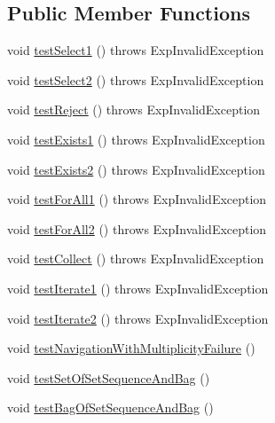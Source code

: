 \subsection*{Public Member Functions}
\begin{DoxyCompactItemize}
\item 
void \hyperlink{classorg_1_1tzi_1_1use_1_1uml_1_1ocl_1_1expr_1_1_exp_query_test_a48f9c32de266f47f7a2e7deccea89e3f}{test\-Select1} ()  throws Exp\-Invalid\-Exception 
\item 
void \hyperlink{classorg_1_1tzi_1_1use_1_1uml_1_1ocl_1_1expr_1_1_exp_query_test_a44a19bb900652731938106e8db5e33ff}{test\-Select2} ()  throws Exp\-Invalid\-Exception 
\item 
void \hyperlink{classorg_1_1tzi_1_1use_1_1uml_1_1ocl_1_1expr_1_1_exp_query_test_a524c7f648f0b6d2ce600016763020699}{test\-Reject} ()  throws Exp\-Invalid\-Exception 
\item 
void \hyperlink{classorg_1_1tzi_1_1use_1_1uml_1_1ocl_1_1expr_1_1_exp_query_test_a9680e0825b4ad2004eacb80a361f6c93}{test\-Exists1} ()  throws Exp\-Invalid\-Exception 
\item 
void \hyperlink{classorg_1_1tzi_1_1use_1_1uml_1_1ocl_1_1expr_1_1_exp_query_test_a1529ea71363b55a8ad2ff38074d3a0f1}{test\-Exists2} ()  throws Exp\-Invalid\-Exception 
\item 
void \hyperlink{classorg_1_1tzi_1_1use_1_1uml_1_1ocl_1_1expr_1_1_exp_query_test_a9b1b40019e4f3f73c9524ae219293b9a}{test\-For\-All1} ()  throws Exp\-Invalid\-Exception 
\item 
void \hyperlink{classorg_1_1tzi_1_1use_1_1uml_1_1ocl_1_1expr_1_1_exp_query_test_ac8f35717bdc4b2c28c3fe66409ba7d96}{test\-For\-All2} ()  throws Exp\-Invalid\-Exception 
\item 
void \hyperlink{classorg_1_1tzi_1_1use_1_1uml_1_1ocl_1_1expr_1_1_exp_query_test_a46e50ffd2ebe64d2f19d60272c5c2320}{test\-Collect} ()  throws Exp\-Invalid\-Exception 
\item 
void \hyperlink{classorg_1_1tzi_1_1use_1_1uml_1_1ocl_1_1expr_1_1_exp_query_test_abea1607bf570adfc31d3c3299071f634}{test\-Iterate1} ()  throws Exp\-Invalid\-Exception 
\item 
void \hyperlink{classorg_1_1tzi_1_1use_1_1uml_1_1ocl_1_1expr_1_1_exp_query_test_a5adafbd5dea348f8845e4c244c10811a}{test\-Iterate2} ()  throws Exp\-Invalid\-Exception 
\item 
void \hyperlink{classorg_1_1tzi_1_1use_1_1uml_1_1ocl_1_1expr_1_1_exp_query_test_a7d6e7c64bdaf927363b6ac3a5778f42b}{test\-Navigation\-With\-Multiplicity\-Failure} ()
\item 
void \hyperlink{classorg_1_1tzi_1_1use_1_1uml_1_1ocl_1_1expr_1_1_exp_query_test_aa06357dc120b8121ede450a91c68c4da}{test\-Set\-Of\-Set\-Sequence\-And\-Bag} ()
\item 
void \hyperlink{classorg_1_1tzi_1_1use_1_1uml_1_1ocl_1_1expr_1_1_exp_query_test_aa0adf85e0144fad7c728e9e1b2a44824}{test\-Bag\-Of\-Set\-Sequence\-And\-Bag} ()
\end{DoxyCompactItemize}
